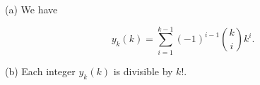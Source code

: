 (a) We have

$$y_k(k) = \sum_{i=1}^{k-1} (-1)^{i-1} \binom{k}{i} k^i.$$

(b) Each integer $y_k(k)$ is divisible by $k!$.
